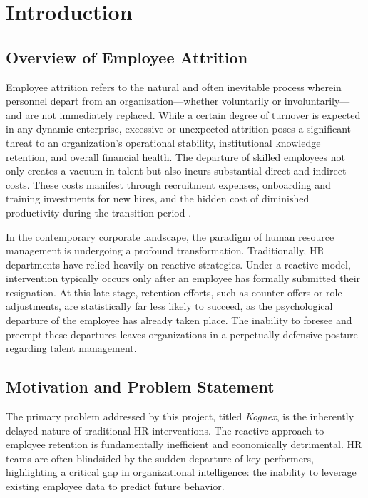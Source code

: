 \chapter{Introduction}

\section{Overview of Employee Attrition}
Employee attrition refers to the natural and often inevitable process wherein personnel depart from an organization—whether voluntarily or involuntarily—and are not immediately replaced. While a certain degree of turnover is expected in any dynamic enterprise, excessive or unexpected attrition poses a significant threat to an organization's operational stability, institutional knowledge retention, and overall financial health. The departure of skilled employees not only creates a vacuum in talent but also incurs substantial direct and indirect costs. These costs manifest through recruitment expenses, onboarding and training investments for new hires, and the hidden cost of diminished productivity during the transition period \cite{cascio2015investing}. 

In the contemporary corporate landscape, the paradigm of human resource management is undergoing a profound transformation. Traditionally, HR departments have relied heavily on reactive strategies. Under a reactive model, intervention typically occurs only after an employee has formally submitted their resignation. At this late stage, retention efforts, such as counter-offers or role adjustments, are statistically far less likely to succeed, as the psychological departure of the employee has already taken place. The inability to foresee and preempt these departures leaves organizations in a perpetually defensive posture regarding talent management.

\section{Motivation and Problem Statement}
The primary problem addressed by this project, titled \textit{Kognex}, is the inherently delayed nature of traditional HR interventions. The reactive approach to employee retention is fundamentally inefficient and economically detrimental. HR teams are often blindsided by the sudden departure of key performers, highlighting a critical gap in organizational intelligence: the inability to leverage existing employee data to predict future behavior.

